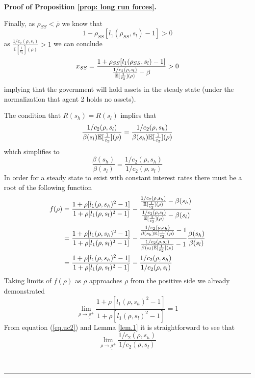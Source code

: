 \documentclass[thmsb,11pt]{article}
\newenvironment{proof}[1][Proof]{\noindent \textbf{#1.} }{\  \rule{0.5em}{0.5em}}
\begin{document}
{\begin{proof}[Proof of Proposition \ref{prop: long run forces}]
\begin{description}
Finally, as $\rho_{SS} < \overline \rho$ we know that
\begin{equation*}
1+\rho_{SS}[l_1(\rho_{SS},s_l)-1] >0
\end{equation*}%
as $\frac{1/c_2(\rho,s_l)}{\mathbb{E}[\frac1{c_2}](\rho)} >1$ we can
conclude
\begin{equation*}
x_{SS} = \frac{1+\rho_{SS}[l_1(\rho_{SS},s_l)-1]}{\frac{1/c_2(\rho,s_l)}{%
\mathbb{E}[\frac1{c_2}](\rho)}-\beta} >0
\end{equation*}%
implying that the government will hold assets in the steady state (under the
normalization that agent 2 holds no assets).

\item[Part 2.] The condition that $R(s_h) = R(s_l)$ implies that
\begin{equation*}
\frac{1/c_2(\rho,s_l)}{\beta(s_l)\mathbb{E}[\frac1{c_2}](\rho)} = \frac{%
1/c_2(\rho,s_h)}{\beta(s_h)\mathbb{E}[\frac1{c_2}](\rho)}
\end{equation*}%
which simplifies to
\begin{equation}
\frac{\beta(s_h)}{\beta(s_l)} = \frac{1/c_2(\rho,s_h)}{1/c_2(\rho,s_l)}
\end{equation}
In order for a steady state to exist with constant interest rates there must
be a root of the following function
\begin{align*}
f(\rho) &= \frac{1+\rho[l_1(\rho,s_h)^2-1]}{1+\rho[l_1(\rho,s_l)^2-1]}-\frac{%
\frac{1/c_2(\rho,s_h)}{\mathbb{E}[\frac1{c_2}](\rho)}-\beta(s_h) }{\frac{%
1/c_2(\rho,s_l)}{\mathbb{E}[\frac1{c_2}](\rho)}-\beta(s_l)} \\
&= \frac{1+\rho[l_1(\rho,s_h)^2-1]}{1+\rho[l_1(\rho,s_l)^2-1]}-\frac{\frac{%
1/c_2(\rho,s_h)}{\beta(s_h)\mathbb{E}[\frac1{c_2}](\rho)}-1 }{\frac{%
1/c_2(\rho,s_l)}{\beta(s_l)\mathbb{E}[\frac1{c_2}](\rho)}-1}\frac{\beta(s_h)%
}{\beta(s_l)} \\
& = \frac{1+\rho[l_1(\rho,s_h)^2-1]}{1+\rho[l_1(\rho,s_l)^2-1]}-\frac{%
1/c_2(\rho,s_h)}{1/c_2(\rho,s_l)}
\end{align*}
Taking limits of $f(\rho)$ as $\rho$ approaches $\underline\rho$ from the
positive side we already demonstrated
\begin{equation*}
\lim_{\rho\rightarrow\underline\rho^+}\frac{1+\rho[l_1(\rho,s_h)^2-1]}{1+\rho%
[l_1(\rho,s_l)^2-1]} = 1
\end{equation*}
From equation (\ref{eq.uc2}) and Lemma \ref{lem.1} it is straightforward to
see that
\begin{equation*}
\lim_{\rho\rightarrow\underline\rho^+}\frac{1/c_2(\rho,s_h)}{1/c_2(\rho,s_l)}

\end{equation*}
\end{description}
\end{proof}}
\end{document}
